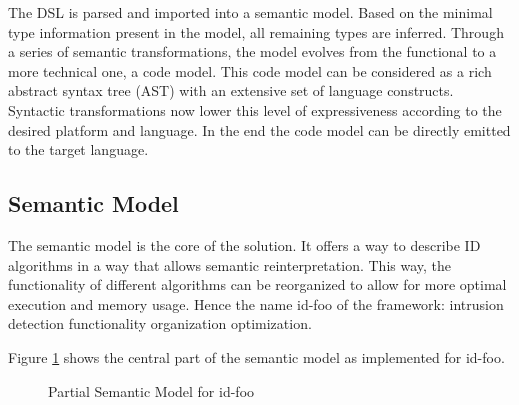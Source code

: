\documentclass[conference]{IEEEtran}
\newcommand{\NAME}{id-foo\xspace}
\begin{document}
The DSL is parsed and imported into a semantic model. Based on the minimal type
information present in the model, all remaining types are inferred. Through a
series of semantic transformations, the model evolves from the functional to a
more technical one, a code model. This code model can be considered as a rich
abstract syntax tree (AST) with an extensive set of language constructs.
Syntactic transformations now lower this level of expressiveness according to
the desired platform and language. In the end the code model can be directly
emitted to the target language.

\subsection*{Semantic Model}

The semantic model is the core of the solution. It offers a way to describe ID
algorithms in a way that allows semantic reinterpretation. This way, the
functionality of different algorithms can be reorganized to allow for more
optimal execution and memory usage. Hence the name \NAME of the framework:
intrusion detection functionality organization optimization.

Figure \ref{fig:meta-model} shows the central part of the semantic model as
implemented for \NAME.

\begin{figure}[ht]
  \centering
\caption{Partial Semantic Model for \NAME}
\label{fig:meta-model}
\end{figure}
\end{document}
